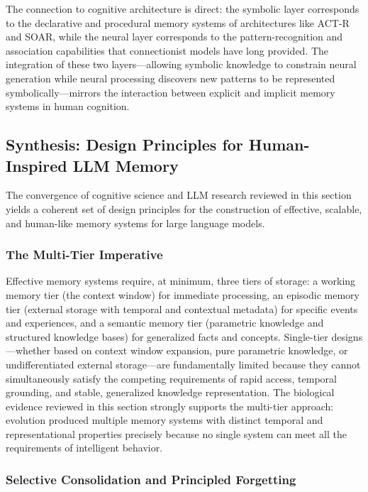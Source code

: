 \documentclass[11pt,letterpaper]{article}
\begin{document}
The connection to cognitive architecture is direct: the symbolic layer corresponds to the declarative and procedural memory systems of architectures like ACT-R and SOAR, while the neural layer corresponds to the pattern-recognition and association capabilities that connectionist models have long provided. The integration of these two layers---allowing symbolic knowledge to constrain neural generation while neural processing discovers new patterns to be represented symbolically---mirrors the interaction between explicit and implicit memory systems in human cognition.

\subsection{Synthesis: Design Principles for Human-Inspired LLM Memory}

The convergence of cognitive science and LLM research reviewed in this section yields a coherent set of design principles for the construction of effective, scalable, and human-like memory systems for large language models.

\subsubsection{The Multi-Tier Imperative}

Effective memory systems require, at minimum, three tiers of storage: a working memory tier (the context window) for immediate processing, an episodic memory tier (external storage with temporal and contextual metadata) for specific events and experiences, and a semantic memory tier (parametric knowledge and structured knowledge bases) for generalized facts and concepts. Single-tier designs---whether based on context window expansion, pure parametric knowledge, or undifferentiated external storage---are fundamentally limited because they cannot simultaneously satisfy the competing requirements of rapid access, temporal grounding, and stable, generalized knowledge representation. The biological evidence reviewed in this section strongly supports the multi-tier approach: evolution produced multiple memory systems with distinct temporal and representational properties precisely because no single system can meet all the requirements of intelligent behavior.

\subsubsection{Selective Consolidation and Principled Forgetting}
\end{document}

